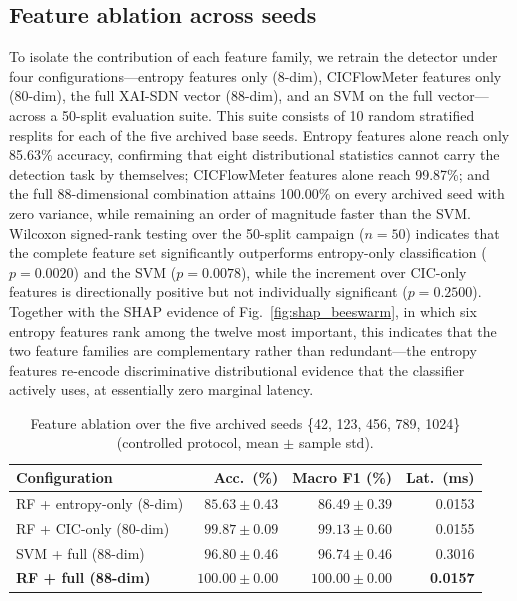 \documentclass{ieeeaccess}
\begin{document}
\subsection{Feature ablation across seeds}
To isolate the contribution of each feature family, we retrain the detector under four configurations---entropy features only (8-dim), CICFlowMeter features only (80-dim), the full XAI-SDN vector (88-dim), and an SVM on the full vector---across a 50-split evaluation suite. This suite consists of 10 random stratified resplits for each of the five archived base seeds. Entropy features alone reach only 85.63\% accuracy, confirming that eight distributional statistics cannot carry the detection task by themselves; CICFlowMeter features alone reach 99.87\%; and the full 88-dimensional combination attains 100.00\% on every archived seed with zero variance, while remaining an order of magnitude faster than the SVM. Wilcoxon signed-rank testing over the 50-split campaign ($n=50$) indicates that the complete feature set significantly outperforms entropy-only classification ($p=0.0020$) and the SVM ($p=0.0078$), while the increment over CIC-only features is directionally positive but not individually significant ($p=0.2500$). Together with the SHAP evidence of Fig.~\ref{fig:shap_beeswarm}, in which six entropy features rank among the twelve most important, this indicates that the two feature families are complementary rather than redundant---the entropy features re-encode discriminative distributional evidence that the classifier actively uses, at essentially zero marginal latency.

\begin{table}
\caption{Feature ablation over the five archived seeds \{42, 123, 456, 789, 1024\}
\centering (controlled protocol, mean $\pm$ sample std).}
\label{tab:ablation}
\small
\setlength{\tabcolsep}{3.5pt}
\begin{tabular}{@{}lrrr@{}}
\toprule
\textbf{Configuration} & \textbf{Acc.\ (\%)} & \textbf{Macro F1 (\%)} & \textbf{Lat.\ (ms)} \\
\midrule
RF + entropy-only (8-dim) & $85.63 \pm 0.43$ & $86.49 \pm 0.39$ & 0.0153 \\
RF + CIC-only (80-dim) & $99.87 \pm 0.09$ & $99.13 \pm 0.60$ & 0.0155 \\
SVM + full (88-dim) & $96.80 \pm 0.46$ & $96.74 \pm 0.46$ & 0.3016 \\
\textbf{RF + full (88-dim)} & $\mathbf{100.00 \pm 0.00}$ & $\mathbf{100.00 \pm 0.00}$ & \textbf{0.0157} \\
\bottomrule
\end{tabular}
\end{table}
\end{document}

